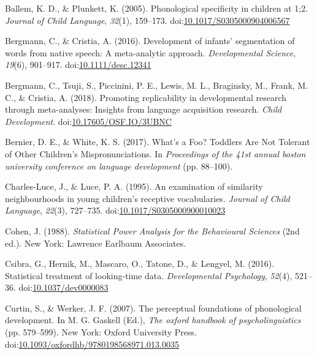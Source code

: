 \documentclass[
  man, noextraspace]{apa6}
\begin{document}
\leavevmode\hypertarget{ref-Ballem2005}{}%
Ballem, K. D., \& Plunkett, K. (2005). Phonological specificity in children at 1;2. \emph{Journal of Child Language}, \emph{32}(1), 159--173. doi:\href{https://doi.org/10.1017/S0305000904006567}{10.1017/S0305000904006567}

\leavevmode\hypertarget{ref-Bergmann2016}{}%
Bergmann, C., \& Cristia, A. (2016). Development of infants' segmentation of words from native speech: A meta-analytic approach. \emph{Developmental Science}, \emph{19}(6), 901--917. doi:\href{https://doi.org/10.1111/desc.12341}{10.1111/desc.12341}

\leavevmode\hypertarget{ref-Bergmann2018}{}%
Bergmann, C., Tsuji, S., Piccinini, P. E., Lewis, M. L., Braginsky, M., Frank, M. C., \& Cristia, A. (2018). Promoting replicability in developmental research through meta-analyses: Insights from language acquisition research. \emph{Child Development}. doi:\href{https://doi.org/10.17605/OSF.IO/3UBNC}{10.17605/OSF.IO/3UBNC}

\leavevmode\hypertarget{ref-Bernier2017}{}%
Bernier, D. E., \& White, K. S. (2017). What's a Foo? Toddlers Are Not Tolerant of Other Children's Mispronunciations. In \emph{Proceedings of the 41st annual boston university conference on language development} (pp. 88--100).

\leavevmode\hypertarget{ref-CharlesLuce1995}{}%
Charles-Luce, J., \& Luce, P. A. (1995). An examination of similarity neighbourhoods in young children's receptive vocabularies. \emph{Journal of Child Language}, \emph{22}(3), 727--735. doi:\href{https://doi.org/10.1017/S0305000900010023}{10.1017/S0305000900010023}

\leavevmode\hypertarget{ref-cohen}{}%
Cohen, J. (1988). \emph{Statistical Power Analysis for the Behavioural Sciences} (2nd ed.). New York: Lawrence Earlbaum Associates.

\leavevmode\hypertarget{ref-Csibra2016}{}%
Csibra, G., Hernik, M., Mascaro, O., Tatone, D., \& Lengyel, M. (2016). Statistical treatment of looking-time data. \emph{Developmental Psychology}, \emph{52}(4), 521--36. doi:\href{https://doi.org/10.1037/dev0000083}{10.1037/dev0000083}

\leavevmode\hypertarget{ref-Curtin2007}{}%
Curtin, S., \& Werker, J. F. (2007). The perceptual foundations of phonological development. In M. G. Gaskell (Ed.), \emph{The oxford handbook of psycholinguistics} (pp. 579--599). New York: Oxford University Press. doi:\href{https://doi.org/10.1093/oxfordhb/9780198568971.013.0035}{10.1093/oxfordhb/9780198568971.013.0035}
\end{document}
